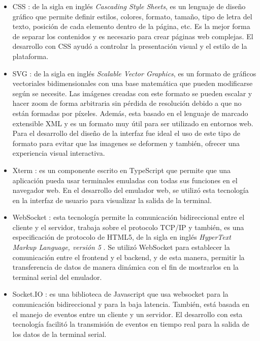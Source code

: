 \begin{itemize}
	\item CSS \citep{CSS}: de la sigla en inglés \textit{Cascading Style Sheets},
	es un lenguaje de diseño gráfico que permite definir estilos, colores, formato, tamaño, tipo de letra del texto, posición de cada elemento dentro de la página, etc. Es la mejor forma de separar los contenidos y es necesario para crear páginas web complejas. El desarrollo con CSS ayudó a controlar la presentación visual y el estilo de la plataforma.

    \item SVG \citep{SVG}: de la sigla en inglés \textit{Scalable Vector Graphics}, es un formato de gráficos vectoriales bidimensionales con una base matemática que pueden modificarse según se necesite. Las imágenes creadas con este formato se pueden escalar y hacer zoom de forma arbitraria sin pérdida de resolución debido a que no están formadas por píxeles. Además, esta basado en el lenguaje de marcado extensible XML \citep{XML} y es un formato muy útil para ser utilizado en entornos web. 
Para el desarrollo del diseño de la interfaz fue ideal el uso de este tipo de formato para evitar que las imagenes se deformen y también, ofrecer una experiencia visual interactiva.

    \item Xterm \citep{Xterm}: es un componente escrito en TypeScript \citep{TypeScript} que permite que una aplicación pueda usar terminales emuladas con todas sus funciones en el navegador web. 
En el desarrollo del emulador web, se utilizó esta tecnología en la interfaz de usuario para visualizar la salida de la terminal.

    \item WebSocket \citep{WebSocket}: esta tecnología permite la comunicación bidireccional entre el cliente y el servidor, trabaja sobre el protocolo TCP/IP y también, es una especificación de protocolo de HTML5, de la sigla en inglés \textit{HyperText Markup Language, versión 5} \citep{HTML5}. 
Se utilizó WebSocket para establecer la comunicación entre el frontend y el backend, y de esta manera, permitir la transferencia de datos de manera dinámica con el fin de mostrarlos en la terminal serial del emulador. 
       
    \item Socket.IO \citep{Socket}: es una biblioteca de Javascript que usa websocket para la comunicación bidireccional y para la baja latencia. También, está basada en el manejo de eventos entre un cliente y un servidor. El desarrollo con esta tecnología facilitó la transmisión de eventos en tiempo real para la salida de los datos de la terminal serial.

\end{itemize}

